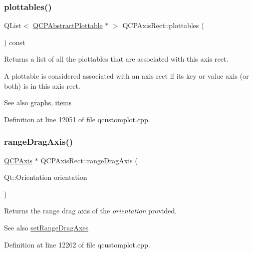 \subsubsection{\texorpdfstring{plottables()}{plottables()}}
{\footnotesize\ttfamily Q\+List$<$ \hyperlink{class_q_c_p_abstract_plottable}{Q\+C\+P\+Abstract\+Plottable} $\ast$ $>$ Q\+C\+P\+Axis\+Rect\+::plottables (\begin{DoxyParamCaption}{ }\end{DoxyParamCaption}) const}

Returns a list of all the plottables that are associated with this axis rect.

A plottable is considered associated with an axis rect if its key or value axis (or both) is in this axis rect.

\begin{DoxySeeAlso}{See also}
\hyperlink{class_q_c_p_axis_rect_a2d9ded3eca97be1fcb5867949391bb88}{graphs}, \hyperlink{class_q_c_p_axis_rect_a03c113a2175448300ee8f944e24776ba}{items} 
\end{DoxySeeAlso}


Definition at line 12051 of file qcustomplot.\+cpp.

\mbox{\label{class_q_c_p_axis_rect_a6d7c22cfc54fac7a3d6ef80b133a8574}} 
\subsubsection{\texorpdfstring{range\+Drag\+Axis()}{rangeDragAxis()}}
{\footnotesize\ttfamily \hyperlink{class_q_c_p_axis}{Q\+C\+P\+Axis} $\ast$ Q\+C\+P\+Axis\+Rect\+::range\+Drag\+Axis (\begin{DoxyParamCaption}\item[{Qt\+::\+Orientation}]{orientation }\end{DoxyParamCaption})}

Returns the range drag axis of the {\itshape orientation} provided.

\begin{DoxySeeAlso}{See also}
\hyperlink{class_q_c_p_axis_rect_a648cce336bd99daac4a5ca3e5743775d}{set\+Range\+Drag\+Axes} 
\end{DoxySeeAlso}


Definition at line 12262 of file qcustomplot.\+cpp.

